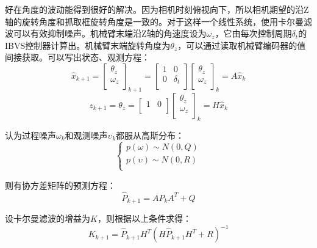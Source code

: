 \documentclass[fontset=fandol,type=bachelor,campus=harbin,bsmainpagenumberline=true]{hithesisbook}
\begin{document}
好在角度的波动能得到很好的解决。因为相机时刻俯视向下，所以相机期望的沿Z轴的旋转角度和抓取框旋转角度是一致的。对于这样一个线性系统，使用卡尔曼滤波可以有效抑制噪声。机械臂末端沿Z轴的角速度设为$\omega_z$，它由每次控制周期$\delta _t$的IBVS控制器计算出。机械臂末端旋转角度为$\theta_z$，可以通过读取机械臂编码器的值间接获取。可以写出状态、观测方程：
\begin{equation}
\hat{x}_{k+1}=\left[ \begin{array}{c}
	\theta _z\\
	\omega _z\\
\end{array} \right] _{k+1}=\left[ \begin{matrix}
	1&		0\\
	0&		\delta _t\\
\end{matrix} \right] \left[ \begin{array}{c}
	\theta _z\\
	\omega _z\\
\end{array} \right] _k=A\hat{x}_k
\label{状态方程}
\end{equation}
\begin{equation}
z_{k+1}=\theta _z=\left[ \begin{matrix}
	1&		0\\
\end{matrix} \right] \left[ \begin{array}{c}
	\theta _z\\
	\omega _z\\
\end{array} \right] _k=H\hat{x}_k
\label{观测方程}
\end{equation}


认为过程噪声$\omega_k$和观测噪声$\upsilon_k$都服从高斯分布：
\begin{equation}
\left\{ \begin{array}{c}
	p\left( \omega \right) \sim N\left( 0,Q \right)\\
	p\left( \upsilon \right) \sim N\left( 0,R \right)\\
\end{array} \right. 
\label{噪声分布}
\end{equation}


则有协方差矩阵的预测方程：
\begin{equation}
\hat{P}_{k+1}=AP_kA^T+Q
\label{协方差预测}
\end{equation}


设卡尔曼滤波的增益为$K$，则根据以上条件求得：
\begin{equation}
K_{k+1}=\hat{P}_{k+1}H^T\left( H\hat{P}_{k+1}H^T+R \right) ^{-1}
\label{卡尔曼滤波的增益}
\end{equation}
\end{document}
